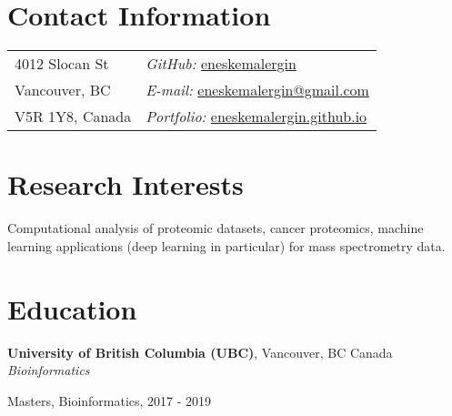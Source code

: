 \documentclass[margin,line]{res}
\newenvironment{list1}{
  \begin{list}{\ding{113}}{%
      \setlength{\itemsep}{0in}
      \setlength{\parsep}{0in} \setlength{\parskip}{0in}
      \setlength{\topsep}{0in} \setlength{\partopsep}{0in} 
      \setlength{\leftmargin}{0.17in}}}{\end{list}}
\newenvironment{list2}{
  \begin{list}{$\bullet$}{%
      \setlength{\itemsep}{0in}
      \setlength{\parsep}{0in} \setlength{\parskip}{0in}
      \setlength{\topsep}{0in} \setlength{\partopsep}{0in} 
      \setlength{\leftmargin}{0.2in}}}{\end{list}}
\begin{document}

\begin{resume}
\section{\sc Contact Information}
\vspace{.05in}
\begin{tabular}{@{}p{2in}p{4in}}
4012 Slocan St               & \hfill {\it GitHub:}  \href{https://github.com/eneskemalergin}{eneskemalergin} \\
Vancouver, BC    & \hfill {\it E-mail:}  \href{mailto:eneskemalergin@gmail.com}{eneskemalergin@gmail.com}\\
V5R 1Y8, Canada        & \hfill {\it Portfolio:}  \href{eneskemalergin.github.io}{eneskemalergin.github.io} \\
\end{tabular}


\section{\sc Research Interests}
Computational analysis of proteomic datasets, cancer proteomics, machine learning applications (deep learning in particular) for mass spectrometry data.

\section{\sc Education}



{\bf University of British Columbia (UBC)}, Vancouver, BC Canada\\
{\em Bioinformatics} 
\begin{list1}
\item[]  Masters, Bioinformatics, 2017 - 2019
\end{list1}


\end{resume}
\end{document}
